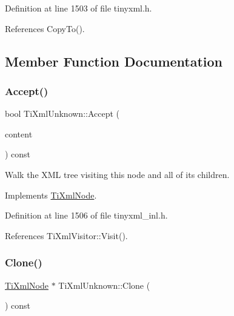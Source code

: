 Definition at line 1503 of file tinyxml.\+h.



References Copy\+To().



\subsection{Member Function Documentation}
\hypertarget{class_ti_xml_unknown_aafdf1b2d4f561979c7907bad91004999}{}\label{class_ti_xml_unknown_aafdf1b2d4f561979c7907bad91004999} 
\subsubsection{\texorpdfstring{Accept()}{Accept()}}
{\footnotesize\ttfamily bool Ti\+Xml\+Unknown\+::\+Accept (\begin{DoxyParamCaption}\item[{\hyperlink{class_ti_xml_visitor}{Ti\+Xml\+Visitor} $\ast$}]{content }\end{DoxyParamCaption}) const\hspace{0.3cm}{\ttfamily [virtual]}}

Walk the X\+ML tree visiting this node and all of its children. 

Implements \hyperlink{class_ti_xml_node_acc0f88b7462c6cb73809d410a4f5bb86}{Ti\+Xml\+Node}.



Definition at line 1506 of file tinyxml\+\_\+inl.\+h.



References Ti\+Xml\+Visitor\+::\+Visit().

\hypertarget{class_ti_xml_unknown_a3dea7689de5b1931fd6657992948fde0}{}\label{class_ti_xml_unknown_a3dea7689de5b1931fd6657992948fde0} 
\subsubsection{\texorpdfstring{Clone()}{Clone()}}
{\footnotesize\ttfamily \hyperlink{class_ti_xml_node}{Ti\+Xml\+Node} $\ast$ Ti\+Xml\+Unknown\+::\+Clone (\begin{DoxyParamCaption}{ }\end{DoxyParamCaption}) const\hspace{0.3cm}{\ttfamily [virtual]}}



